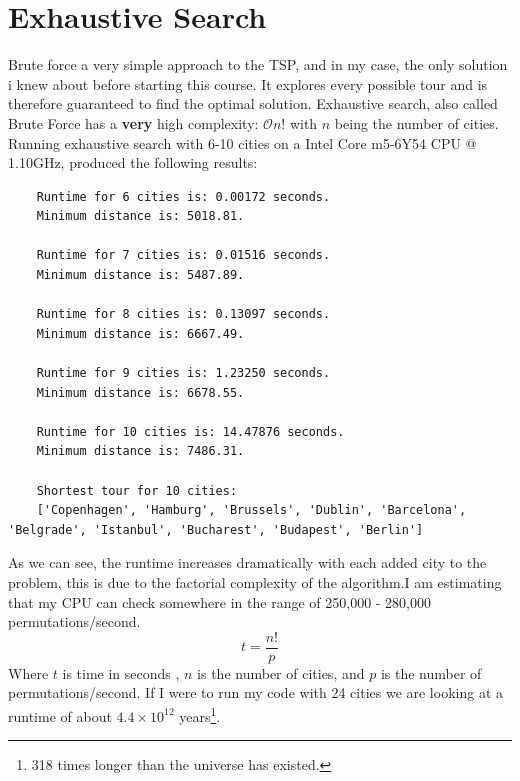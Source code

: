 \documentclass[a4paper, norsk, 12pt]{article}
\begin{document}
\section{Exhaustive Search}
Brute force a very simple approach to the TSP, and in my case, the only solution i knew about before starting this course. It explores every possible tour and is therefore guaranteed to find the optimal solution. Exhaustive search, also called Brute Force has a \textbf{very} high complexity: $\mathcal{O}{n!}$ with $n$ being the number of cities. 
\newline \newline 
Running exhaustive search with 6-10 cities on a Intel Core m5-6Y54 CPU @ 1.10GHz, produced the following results: 
	\begin{lstlisting}
	Runtime for 6 cities is: 0.00172 seconds.
	Minimum distance is: 5018.81.
	
	Runtime for 7 cities is: 0.01516 seconds.
	Minimum distance is: 5487.89.
		
	Runtime for 8 cities is: 0.13097 seconds.
	Minimum distance is: 6667.49.
	
	Runtime for 9 cities is: 1.23250 seconds.
	Minimum distance is: 6678.55.

	Runtime for 10 cities is: 14.47876 seconds.
	Minimum distance is: 7486.31.

	Shortest tour for 10 cities:
	['Copenhagen', 'Hamburg', 'Brussels', 'Dublin', 'Barcelona', 'Belgrade', 'Istanbul', 'Bucharest', 'Budapest', 'Berlin']
	\end{lstlisting}
As we can see, the runtime increases dramatically with each added city to the problem, this is due to the factorial complexity of the algorithm.I am estimating that my CPU can check somewhere in the range of 250,000 - 280,000 permutations/second. 
\[ 
	t =  \frac{n!}{p}
\]
Where $t$ is time in seconds , $n$ is the number of cities, and $p$ is the number of permutations/second. 
If I were to run my code with 24 cities we are looking at a runtime of about $4.4\times 10^{12}$ years\footnote{318 times longer than the universe has existed.}.
\end{document}
